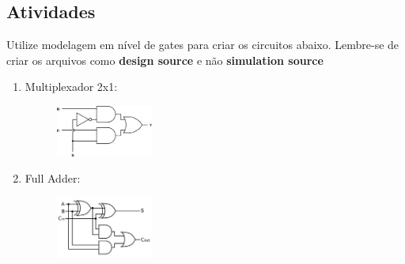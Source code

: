 \documentclass[a4paper]{article}
\begin{document}
\subsection*{Atividades}
Utilize modelagem em nível de gates para criar os circuitos abaixo. Lembre-se de criar os arquivos como \textbf{design source} e não \textbf{simulation source}

\begin{enumerate}
\item Multiplexador 2x1:
	\begin{figure}[H]
	\centering
	\includegraphics[width=0.3\textwidth]{images/mux2x1.jpg}
	\end{figure}
		
\item Full Adder:
	\begin{figure}[!h]
	\centering
	\includegraphics[width=0.3\textwidth]{images/fulladder.jpg}
	\end{figure}
	
\end{enumerate}
\end{document}
